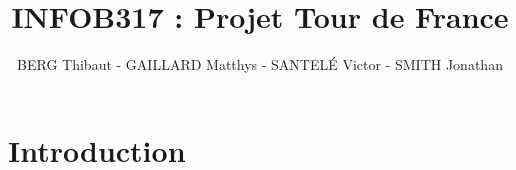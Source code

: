 \documentclass[a4paper, 11pt]{article}
\title{INFOB317 : Projet Tour de France}
\author{BERG Thibaut - GAILLARD Matthys - SANTELÉ Victor - SMITH Jonathan}
\begin{document}
\maketitle

\newpage

\section{Introduction}
\end{document}
